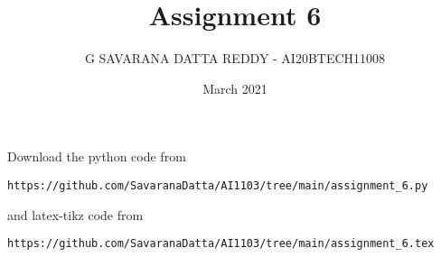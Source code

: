 \documentclass[journal,12pt,twocolumn]{IEEEtran}
\date{March 2021}
\DeclareMathOperator*{\Res}{Res}
\begin{document}
\newcommand{\BEQA}{\begin{eqnarray}}
\newcommand{\EEQA}{\end{eqnarray}}
\newcommand{\define}{\stackrel{\triangle}{=}}

\raggedbottom
\setlength{\parindent}{0pt}
\providecommand{\mbf}{\mathbf}
\providecommand{\pr}[1]{\ensuremath{\Pr\left(#1\right)}}
\providecommand{\qfunc}[1]{\ensuremath{Q\left(#1\right)}}
\providecommand{\fn}[1]{\ensuremath{f\left(#1\right)}}
\providecommand{\e}[1]{\ensuremath{E\left(#1\right)}}
\providecommand{\sbrak}[1]{\ensuremath{{}\left[#1\right]}}
\providecommand{\lsbrak}[1]{\ensuremath{{}\left[#1\right.}}
\providecommand{\rsbrak}[1]{\ensuremath{{}\left.#1\right]}}
\providecommand{\brak}[1]{\ensuremath{\left(#1\right)}}
\providecommand{\lbrak}[1]{\ensuremath{\left(#1\right.}}
\providecommand{\rbrak}[1]{\ensuremath{\left.#1\right)}}
\providecommand{\cbrak}[1]{\ensuremath{\left\{#1\right\}}}
\providecommand{\lcbrak}[1]{\ensuremath{\left\{#1\right.}}
\providecommand{\rcbrak}[1]{\ensuremath{\left.#1\right\}}}
\theoremstyle{remark}
\newtheorem{rem}{Remark}
\newcommand{\sgn}{\mathop{\mathrm{sgn}}}
\providecommand{\abs}[1]{\vert#1\vert}
\providecommand{\res}[1]{\Res\displaylimits_{#1}} 
\providecommand{\norm}[1]{\lVert#1\rVert}
\providecommand{\mtx}[1]{\mathbf{#1}}
\providecommand{\mean}[1]{E[ #1 ]}
\providecommand{\fourier}{\overset{\mathcal{F}}{ \rightleftharpoons}}
\providecommand{\system}{\overset{\mathcal{H}}{ \longleftrightarrow}}
\newcommand{\solution}{\noindent \textbf{Solution: }}
\newcommand{\cosec}{\,\text{cosec}\,}
\providecommand{\dec}[2]{\ensuremath{\overset{#1}{\underset{#2}{\gtrless}}}}
\newcommand{\myvec}[1]{\ensuremath{\begin{pmatrix}#1\end{pmatrix}}}
\newcommand{\mydet}[1]{\ensuremath{\begin{vmatrix}#1\end{vmatrix}}}
\makeatletter
\vspace{3cm}
\title{Assignment 6}
\author{G SAVARANA DATTA REDDY - AI20BTECH11008}
\maketitle
\newpage
\bigskip
\renewcommand{\thetable}{\theenumi}
Download the python code from 
\begin{lstlisting}
https://github.com/SavaranaDatta/AI1103/tree/main/assignment_6.py
\end{lstlisting}
%
and latex-tikz code from 
%
\begin{lstlisting}
https://github.com/SavaranaDatta/AI1103/tree/main/assignment_6.tex
\end{lstlisting}
\end{document}
